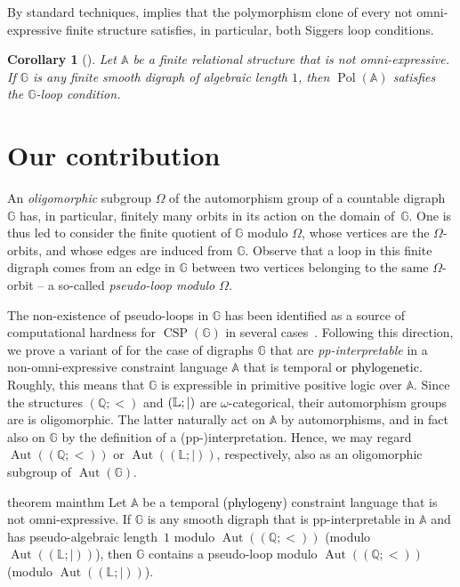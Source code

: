 \documentclass[a4paper,reqno, cleveref]{amsart}
\newtheorem{corollary}[theorem]{Corollary}
\newcommand{\Q}{\mathbb{Q}}
\newcommand{\struct}[1]{\mathbb{#1}}
\DeclareMathOperator{\CSP}{CSP}
\DeclareMathOperator{\Pol}{Pol}
\DeclareMathOperator{\Aut}{Aut}
\newcommand{\sA}{\mathbb A}
\newcommand{\sG}{\mathbb G}
\newcommand{\Phylo}[1]{\ensuremath{(\struct{L};|)}#1}
\newcommand\jo[1]{\textcolor{black}{#1}} %
\begin{document}
By standard techniques,  implies that the polymorphism clone of every not omni-expressive finite structure  satisfies, in particular, both  Siggers loop conditions.

\begin{corollary}[\cite{KearnesMarkovicMcKenzie}]\label{corollary:KMM15}
    Let $\sA$ be a  finite  relational structure that is not omni-expressive. If $\sG$ is any finite smooth digraph of algebraic length $1$, then $\Pol(\sA)$ satisfies the $\sG$-loop condition. 
\end{corollary}

\section{Our contribution}
An \emph{oligomorphic}  subgroup $\Omega$ of the automorphism group of a countable digraph~$\sG$ has, in particular, finitely many orbits in its action
 on the domain of~$\sG$. One is thus led to consider the finite quotient of $\sG$ modulo $\Omega$, whose vertices are the $\Omega$-orbits, and whose edges are induced from $\sG$. Observe that a loop in this finite digraph comes from an edge in $\sG$ between two vertices belonging to the same $\Omega$-orbit -- a so-called \emph{pseudo-loop modulo $\Omega$}. 
 
 The non-existence of pseudo-loops in $\sG$ has been identified as a source of computational hardness for $\CSP(\sG)$ in several cases~\cite{Topo,symmetries,sorrows}. %
 Following this direction, we prove a variant of  for the case of digraphs $\sG$ that are \emph{pp-interpretable} in a non-omni-expressive constraint language $\sA$ that is temporal \jo{or phylogenetic}.  Roughly, this means that $\sG$ is expressible in primitive positive logic over $\sA$. 
 Since the structures $(\Q; <)$ and $\Phylo$ are $\omega$-categorical, their automorphism groups are is oligomorphic. The latter naturally act on $\sA$ by automorphisms, and in fact also on $\sG$ by the definition of a (pp-)interpretation.  
 Hence, we may regard $\Aut((\Q;<))$ or $\Aut(\Phylo)$, respectively, also as an oligomorphic subgroup of $\Aut(\sG)$.  

\begin{restatable}{theorem} {mainthm}\label{theorem:pseudoloop} Let $\sA$ be a  temporal \jo{(phylogeny)} constraint language that is not omni-expressive. If $\sG$ is any smooth digraph that is pp-interpretable in $\sA$ and has pseudo-algebraic length~$1$ modulo $\Aut((\Q;<))$ (modulo $\Aut(\Phylo)$), then $\sG$ contains a pseudo-loop modulo $\Aut((\Q;<))$ (modulo $\Aut(\Phylo)$).
\end{restatable} 
\end{document}
